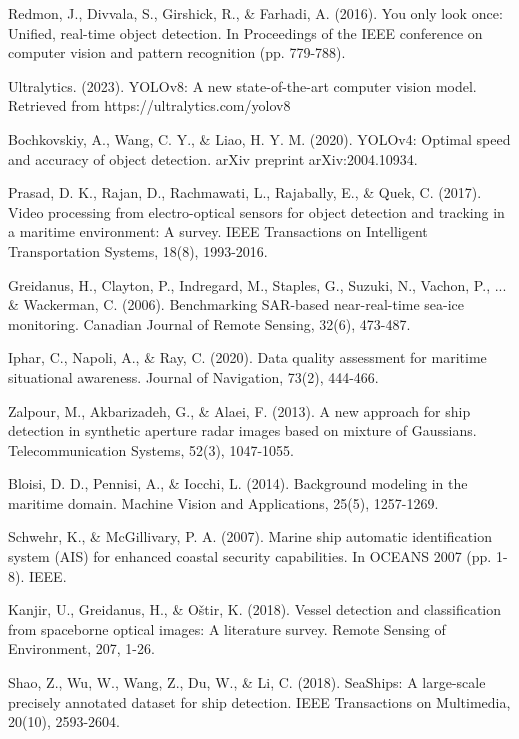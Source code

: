 \documentclass[12pt,a4paper]{report}
\begin{document}
\begin{thebibliography}{99}

Redmon, J., Divvala, S., Girshick, R., \& Farhadi, A. (2016). You only look once: Unified, real-time object detection. In Proceedings of the IEEE conference on computer vision and pattern recognition (pp. 779-788).

Ultralytics. (2023). YOLOv8: A new state-of-the-art computer vision model. Retrieved from https://ultralytics.com/yolov8

Bochkovskiy, A., Wang, C. Y., \& Liao, H. Y. M. (2020). YOLOv4: Optimal speed and accuracy of object detection. arXiv preprint arXiv:2004.10934.

Prasad, D. K., Rajan, D., Rachmawati, L., Rajabally, E., \& Quek, C. (2017). Video processing from electro-optical sensors for object detection and tracking in a maritime environment: A survey. IEEE Transactions on Intelligent Transportation Systems, 18(8), 1993-2016.

Greidanus, H., Clayton, P., Indregard, M., Staples, G., Suzuki, N., Vachon, P., ... \& Wackerman, C. (2006). Benchmarking SAR-based near-real-time sea-ice monitoring. Canadian Journal of Remote Sensing, 32(6), 473-487.

Iphar, C., Napoli, A., \& Ray, C. (2020). Data quality assessment for maritime situational awareness. Journal of Navigation, 73(2), 444-466.

Zalpour, M., Akbarizadeh, G., \& Alaei, F. (2013). A new approach for ship detection in synthetic aperture radar images based on mixture of Gaussians. Telecommunication Systems, 52(3), 1047-1055.

Bloisi, D. D., Pennisi, A., \& Iocchi, L. (2014). Background modeling in the maritime domain. Machine Vision and Applications, 25(5), 1257-1269.

Schwehr, K., \& McGillivary, P. A. (2007). Marine ship automatic identification system (AIS) for enhanced coastal security capabilities. In OCEANS 2007 (pp. 1-8). IEEE.

Kanjir, U., Greidanus, H., \& Oštir, K. (2018). Vessel detection and classification from spaceborne optical images: A literature survey. Remote Sensing of Environment, 207, 1-26.

Shao, Z., Wu, W., Wang, Z., Du, W., \& Li, C. (2018). SeaShips: A large-scale precisely annotated dataset for ship detection. IEEE Transactions on Multimedia, 20(10), 2593-2604.


\end{thebibliography}
\end{document}
